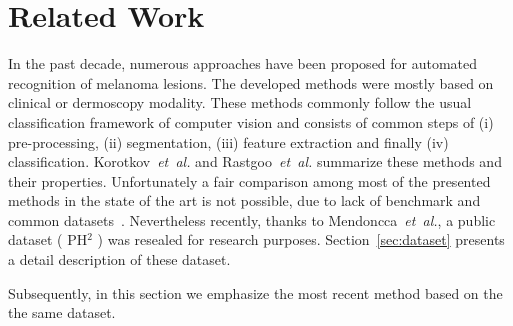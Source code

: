 \section{Related Work}
\label{sec:rw}
In the past decade, numerous approaches have been proposed for automated recognition of melanoma lesions.
The developed methods were mostly based on clinical or dermoscopy modality.
These methods commonly follow the usual classification framework of computer vision and consists of common steps of (i) pre-processing, (ii) segmentation, (iii) feature extraction and finally (iv) classification.
Korotkov~\emph{et~al.}\cite{korotkov2012computerized} and Rastgoo~\emph{et~al.}\cite{rastgoo2015automatic} summarize these methods and their properties.
Unfortunately a fair comparison among most of the presented methods in the state of the art is not possible, due to lack of benchmark and common datasets~\cite{rastgoo2015automatic,korotkov2012computerized}.
Nevertheless recently, thanks to Mendoncca~\emph{et~al.}\cite{mendoncca2013ph}, a public dataset ( PH$^{2}$ ) was resealed for research purposes.
Section~\ref{sec:dataset} presents a detail description of these dataset.

Subsequently, in this section we emphasize the most recent method based on the the same dataset.
% 